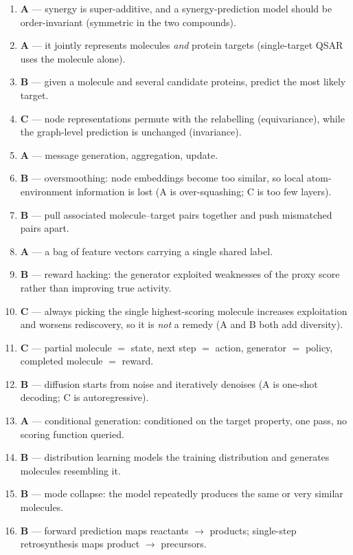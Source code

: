 \documentclass[11pt,oneside]{article}
\begin{document}
\begin{enumerate}[label=\textbf{Q\arabic*.}, leftmargin=3em, itemsep=4pt]
  \item \textbf{A} --- synergy is super-additive, and a synergy-prediction model should be order-invariant (symmetric in the two compounds).
  \item \textbf{A} --- it jointly represents molecules \emph{and} protein targets (single-target QSAR uses the molecule alone).
  \item \textbf{B} --- given a molecule and several candidate proteins, predict the most likely target.
  \item \textbf{C} --- node representations permute with the relabelling (equivariance), while the graph-level prediction is unchanged (invariance).
  \item \textbf{A} --- message generation, aggregation, update.
  \item \textbf{B} --- oversmoothing: node embeddings become too similar, so local atom-environment information is lost (A is over-squashing; C is too few layers).
  \item \textbf{B} --- pull associated molecule--target pairs together and push mismatched pairs apart.
  \item \textbf{A} --- a bag of feature vectors carrying a single shared label.
  \item \textbf{B} --- reward hacking: the generator exploited weaknesses of the proxy score rather than improving true activity.
  \item \textbf{C} --- always picking the single highest-scoring molecule increases exploitation and worsens rediscovery, so it is \emph{not} a remedy (A and B both add diversity).
  \item \textbf{C} --- partial molecule $=$ state, next step $=$ action, generator $=$ policy, completed molecule $=$ reward.
  \item \textbf{B} --- diffusion starts from noise and iteratively denoises (A is one-shot decoding; C is autoregressive).
  \item \textbf{A} --- conditional generation: conditioned on the target property, one pass, no scoring function queried.
  \item \textbf{B} --- distribution learning models the training distribution and generates molecules resembling it.
  \item \textbf{B} --- mode collapse: the model repeatedly produces the same or very similar molecules.
  \item \textbf{B} --- forward prediction maps reactants $\to$ products; single-step retrosynthesis maps product $\to$ precursors.

\end{enumerate}
\end{document}
